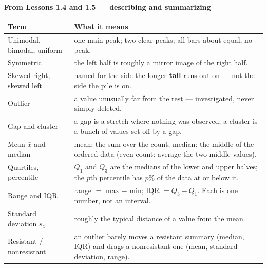 \documentclass[12pt]{article}
\newcommand{\vocabhead}[1]{%
  \textbf{#1}\par\vspace{3pt}}
\begin{document}
\vspace{7pt}
\boxguard[9]
\vocabhead{From Lessons 1.4 and 1.5 --- describing and summarizing}
\noindent\begin{tabularx}{\linewidth}{@{} l X @{}}
\rowcolor{sky}
\textbf{Term} & \textbf{What it means} \\
\midrule
Unimodal, bimodal, uniform & one main peak; two clear peaks; all bars about equal, no peak. \\
Symmetric & the left half is roughly a mirror image of the right half. \\
Skewed right, skewed left & named for the side the longer \textbf{tail} runs out on --- not
                            the side the pile is on. \\
Outlier & a value unusually far from the rest --- investigated, never simply deleted. \\
Gap and cluster & a gap is a stretch where nothing was observed; a cluster is a bunch of values
                  set off by a gap. \\
Mean $\bar x$ and median & mean: the sum over the count; median: the middle of the ordered data
                           (even count: average the two middle values). \\
Quartiles, percentile & $Q_1$ and $Q_3$ are the medians of the lower and upper halves; the $p$th
                        percentile has $p\%$ of the data at or below it. \\
Range and IQR & range $=$ max $-$ min; IQR $= Q_3 - Q_1$. Each is one number, not an
                interval. \\
Standard deviation $s_x$ & roughly the typical distance of a value from the mean. \\
Resistant / nonresistant & an outlier barely moves a resistant summary (median, IQR) and drags a
                           nonresistant one (mean, standard deviation, range). \\
\end{tabularx}
\end{document}
